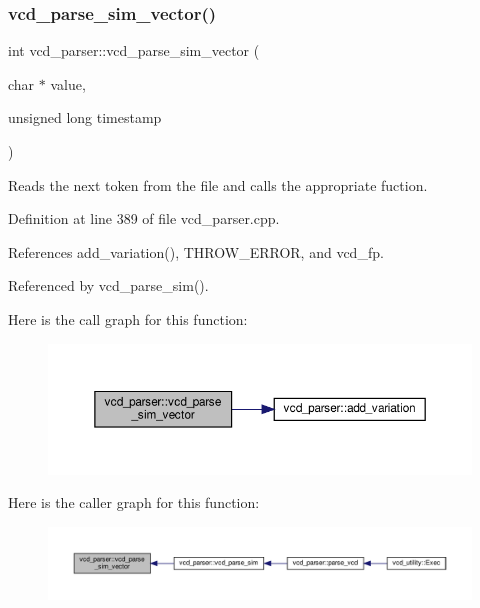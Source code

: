 \subsubsection{\texorpdfstring{vcd\+\_\+parse\+\_\+sim\+\_\+vector()}{vcd\_parse\_sim\_vector()}}
{\footnotesize\ttfamily int vcd\+\_\+parser\+::vcd\+\_\+parse\+\_\+sim\+\_\+vector (\begin{DoxyParamCaption}\item[{char $\ast$}]{value,  }\item[{unsigned long}]{timestamp }\end{DoxyParamCaption})\hspace{0.3cm}{\ttfamily [private]}}



Reads the next token from the file and calls the appropriate fuction. 



Definition at line 389 of file vcd\+\_\+parser.\+cpp.



References add\+\_\+variation(), T\+H\+R\+O\+W\+\_\+\+E\+R\+R\+OR, and vcd\+\_\+fp.



Referenced by vcd\+\_\+parse\+\_\+sim().

Here is the call graph for this function\+:
\nopagebreak
\begin{figure}[H]
\begin{center}
\leavevmode
\includegraphics[width=350pt]{d2/d25/classvcd__parser_aa27eaa7b2cd3eb398d6b06a6253cc3be_cgraph}
\end{center}
\end{figure}
Here is the caller graph for this function\+:
\nopagebreak
\begin{figure}[H]
\begin{center}
\leavevmode
\includegraphics[width=350pt]{d2/d25/classvcd__parser_aa27eaa7b2cd3eb398d6b06a6253cc3be_icgraph}
\end{center}
\end{figure}
\mbox{\label{classvcd__parser_a8bb5288c3fe26415a1a154a1edabf418}} 

